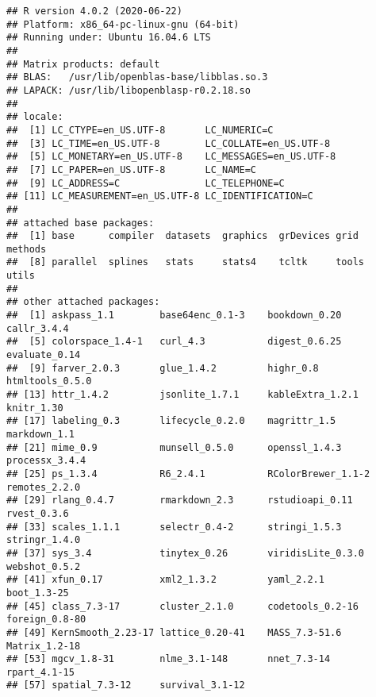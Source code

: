 \documentclass[
]{ctexbook}
\begin{document}
\begin{verbatim}
## R version 4.0.2 (2020-06-22)
## Platform: x86_64-pc-linux-gnu (64-bit)
## Running under: Ubuntu 16.04.6 LTS
## 
## Matrix products: default
## BLAS:   /usr/lib/openblas-base/libblas.so.3
## LAPACK: /usr/lib/libopenblasp-r0.2.18.so
## 
## locale:
##  [1] LC_CTYPE=en_US.UTF-8       LC_NUMERIC=C              
##  [3] LC_TIME=en_US.UTF-8        LC_COLLATE=en_US.UTF-8    
##  [5] LC_MONETARY=en_US.UTF-8    LC_MESSAGES=en_US.UTF-8   
##  [7] LC_PAPER=en_US.UTF-8       LC_NAME=C                 
##  [9] LC_ADDRESS=C               LC_TELEPHONE=C            
## [11] LC_MEASUREMENT=en_US.UTF-8 LC_IDENTIFICATION=C       
## 
## attached base packages:
##  [1] base      compiler  datasets  graphics  grDevices grid      methods  
##  [8] parallel  splines   stats     stats4    tcltk     tools     utils    
## 
## other attached packages:
##  [1] askpass_1.1        base64enc_0.1-3    bookdown_0.20      callr_3.4.4       
##  [5] colorspace_1.4-1   curl_4.3           digest_0.6.25      evaluate_0.14     
##  [9] farver_2.0.3       glue_1.4.2         highr_0.8          htmltools_0.5.0   
## [13] httr_1.4.2         jsonlite_1.7.1     kableExtra_1.2.1   knitr_1.30        
## [17] labeling_0.3       lifecycle_0.2.0    magrittr_1.5       markdown_1.1      
## [21] mime_0.9           munsell_0.5.0      openssl_1.4.3      processx_3.4.4    
## [25] ps_1.3.4           R6_2.4.1           RColorBrewer_1.1-2 remotes_2.2.0     
## [29] rlang_0.4.7        rmarkdown_2.3      rstudioapi_0.11    rvest_0.3.6       
## [33] scales_1.1.1       selectr_0.4-2      stringi_1.5.3      stringr_1.4.0     
## [37] sys_3.4            tinytex_0.26       viridisLite_0.3.0  webshot_0.5.2     
## [41] xfun_0.17          xml2_1.3.2         yaml_2.2.1         boot_1.3-25       
## [45] class_7.3-17       cluster_2.1.0      codetools_0.2-16   foreign_0.8-80    
## [49] KernSmooth_2.23-17 lattice_0.20-41    MASS_7.3-51.6      Matrix_1.2-18     
## [53] mgcv_1.8-31        nlme_3.1-148       nnet_7.3-14        rpart_4.1-15      
## [57] spatial_7.3-12     survival_3.1-12
\end{verbatim}

  
\end{document}
